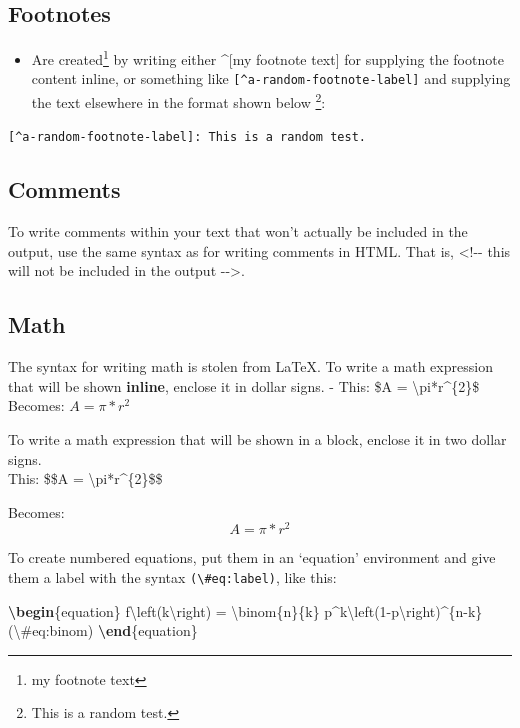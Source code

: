 \documentclass[a4paper, twoside]{templates/ociamthesis}
\providecommand{\tightlist}{%
  \setlength{\itemsep}{0pt}\setlength{\parskip}{0pt}}
\newenvironment{Shaded}{\begin{snugshade}}{\end{snugshade}}
\newcommand{\ExtensionTok}[1]{#1}
\newcommand{\KeywordTok}[1]{\textcolor[rgb]{0.13,0.29,0.53}{\textbf{#1}}}
\newcommand{\NormalTok}[1]{#1}
\newcommand{\SpecialCharTok}[1]{\textcolor[rgb]{0.00,0.00,0.00}{#1}}
\newcommand{\SpecialStringTok}[1]{\textcolor[rgb]{0.31,0.60,0.02}{#1}}
\renewenvironment{Shaded}
{
  \vspace{4pt}%
  \begin{snugshade}%
}{%
  \end{snugshade}%
  \vspace{4pt}%
}
\begin{document}
\hypertarget{footnotes}{%
\subsection{Footnotes}\label{footnotes}}

\begin{itemize}
\tightlist
\item
  Are created\footnote{my footnote text} by writing either \^{}{[}my footnote text{]} for supplying the footnote content inline, or something like \texttt{{[}\^{}a-random-footnote-label{]}} and supplying the text elsewhere in the format shown below \footnote{This is a random test.}:
\end{itemize}

\texttt{{[}\^{}a-random-footnote-label{]}:\ This\ is\ a\ random\ test.}

\hypertarget{comments}{%
\subsection{Comments}\label{comments}}

To write comments within your text that won't actually be included in the output, use the same syntax as for writing comments in HTML. That is, \textless!-\/- this will not be included in the output -\/-\textgreater.

\hypertarget{math}{%
\subsection{Math}\label{math}}

The syntax for writing math is stolen from LaTeX. To write a math expression that will be shown \textbf{inline}, enclose it in dollar signs.
- This: \$A = \textbackslash pi*r\^{}\{2\}\$ Becomes: \(A = \pi*r^{2}\)

To write a math expression that will be shown in a block, enclose it in two dollar signs.\\
This: \$\$A = \textbackslash pi*r\^{}\{2\}\$\$

Becomes:
\[A = \pi*r^{2}\]

To create numbered equations, put them in an `equation' environment and give them a label with the syntax \texttt{(\textbackslash{}\#eq:label)}, like this:

\begin{Shaded}
\begin{Highlighting}[]
\KeywordTok{\textbackslash{}begin}\NormalTok{\{}\ExtensionTok{equation}\NormalTok{\}}\SpecialStringTok{ }
\SpecialStringTok{  f}\SpecialCharTok{\textbackslash{}left}\SpecialStringTok{(k}\SpecialCharTok{\textbackslash{}right}\SpecialStringTok{) = }\SpecialCharTok{\textbackslash{}binom}\SpecialStringTok{\{n\}\{k\} p^k}\SpecialCharTok{\textbackslash{}left}\SpecialStringTok{(1-p}\SpecialCharTok{\textbackslash{}right}\SpecialStringTok{)^\{n-k\}}
\SpecialStringTok{  (}\SpecialCharTok{\textbackslash{}#}\SpecialStringTok{eq:binom)}
\KeywordTok{\textbackslash{}end}\NormalTok{\{}\ExtensionTok{equation}\NormalTok{\} }
\end{Highlighting}
\end{Shaded}
\end{document}

